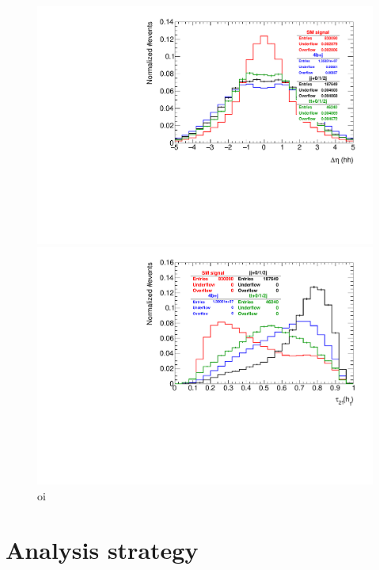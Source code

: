 \begin{figure}
	\centering
	\begin{minipage}{.5\textwidth}
		\centering
		\includegraphics[trim={.65cm 0 0 0},clip,width=\linewidth]{./Figures/hist_hh_deltaEta.pdf}
	\end{minipage}%
	\begin{minipage}{.5\textwidth}
		\centering
		\includegraphics[trim={0 0 .65cm 0},clip,width=\linewidth]{./Figures/hist_h1_tau21.pdf}
		\end{minipage}
		\label{fig:hh_deltaEta_h1_tau21}
		\caption{oi}
\end{figure}
	

\section{Analysis strategy}
\label{section:regions}

